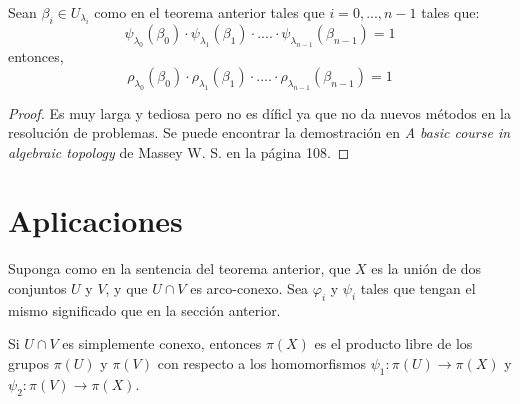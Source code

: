 \documentclass[12pt]{report}
\newcounter{it}
\theoremstyle{largebreak}
\newcommand\cf[3]{\ensuremath{#1:#2\rightarrow#3}}
\begin{document}
    \begin{lema}
        Sean $\beta_i\in U_{\lambda_i}$ como en el teorema anterior tales que $i=0,...,n-1$ tales que:
        \begin{equation*}
            \psi_{\lambda_0}(\beta_0)\cdot\psi_{\lambda_1}(\beta_1)\cdot....\cdot\psi_{\lambda_{ n-1}}(\beta_{ n-1})=1
        \end{equation*}
        entonces,
        \begin{equation*}
            \rho_{\lambda_0}(\beta_0)\cdot\rho_{\lambda_1}(\beta_1)\cdot....\cdot\rho_{\lambda_{ n-1}}(\beta_{ n-1})=1
        \end{equation*}
    \end{lema}

    \begin{proof}
        Es muy larga y tediosa pero no es díficl ya que no da nuevos métodos en la resolución de problemas. Se puede encontrar la demostración en \textit{A basic course in algebraic topology} de Massey W. S. en la página 108. 
    \end{proof}

    \section{Aplicaciones}

    Suponga como en la sentencia del teorema anterior, que $X$ es la unión de dos conjuntos $U$ y $V$, y que $U\cap V$ es arco-conexo. Sea $\varphi_i$ y $\psi_i$ tales que tengan el mismo significado que en la sección anterior.

    \begin{theor}
        Si $U\cap V$ es simplemente conexo, entonces $\pi(X)$ es el producto libre de los grupos $\pi(U)$ y $\pi(V)$ con respecto a los homomorfismos $\cf{\psi_1}{\pi(U)}{\pi(X)}$ y $\cf{\psi_2}{\pi(V)}{\pi(X)}$.
    \end{theor}
\end{document}
